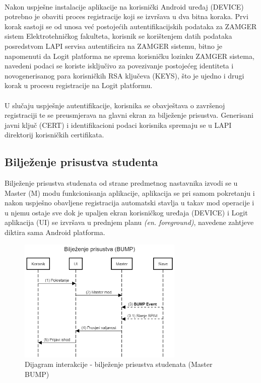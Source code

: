 \paragraph*{}
Nakon uspješne instalacije aplikacije na korisnički Android uređaj (DEVICE) potrebno je obaviti proces registracije koji se izvršava u dva bitna koraka. Prvi korak sastoji se od unosa već postojećih autentifikacijskih podataka za ZAMGER sistem Elektrotehničkog fakulteta, korisnik se korištenjem datih podataka posredstvom LAPI servisa autentificira na ZAMGER sistemu, bitno je napomenuti da Logit platforma ne sprema korisničku lozinku ZAMGER sistema, navedeni podaci se koriste isključivo za povezivanje postojećeg identiteta i novogenerisanog para korisničkih RSA ključeva (KEYS), što je ujedno i drugi korak u procesu registracije na Logit platformu.

\paragraph*{}
U slučaju uspješnje autentifikacije, korisnika se obavještava o završenoj registraciji te se preusmjerava na glavni ekran za bilježenje prisustva. Generisani javni ključ (CERT) i identifikacioni podaci korisnika spremaju se u LAPI direktorij korisničkih certifikata.

\subsection*{Bilježenje prisustva studenta}
Bilježenje prisustva studenata od strane predmetnog nastavnika izvodi se u Master (M) modu funkcionisanja aplikacije, aplikacija se pri samom pokretanju i nakon uspješno obavljene registracija automatski stavlja u takav mod operacije i u njemu ostaje sve dok je upaljen ekran korisničkog uređaja (DEVICE) i Logit aplikacija (UI) se izvršava u prednjem planu \textit{(en. foreground)}, navedene zahtjeve diktira sama Android platforma.

\begin{figure}[H]
    \centering
    \includegraphics[width=0.7\textwidth]{material/dia/02_bump}
    \caption{Dijagram interakcije - bilježenje prisustva studenata (Master BUMP)}
\end{figure}
